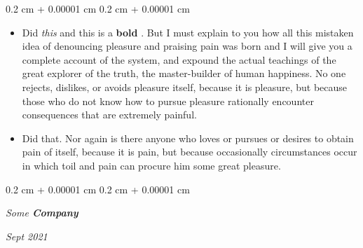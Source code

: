\documentclass[10pt, letterpaper]{article}
\newenvironment{highlights}{
    \begin{itemize}[
        topsep=0.10 cm,
        parsep=0.10 cm,
        partopsep=0pt,
        itemsep=0pt,
        leftmargin=0.4 cm + 10pt
    ]
}{
    \end{itemize}
} %
\newenvironment{onecolentry}{
    \begin{adjustwidth}{
        0.2 cm + 0.00001 cm
    }{
        0.2 cm + 0.00001 cm
    }
}{
    \end{adjustwidth}
} %
\newenvironment{twocolentry}[2][]{
    \onecolentry
    \def\secondColumn{#2}
    \setcolumnwidth{\fill, 4.5 cm}
    \begin{paracol}{2}
}{
    \switchcolumn \raggedleft \secondColumn
    \end{paracol}
    \endonecolentry
} %
\let\hrefWithoutArrow\href
\renewcommand{\href}[2]{\hrefWithoutArrow{#1}{\ifthenelse{\equal{#2}{}}{ }{#2 }\raisebox{.15ex}{\footnotesize \faExternalLink*}}}
\begin{document}
        \vspace{0.10 cm}
        \begin{onecolentry}
            \begin{highlights}
                \item Did \textit{this} and this is a \textbf{bold} \href{https://example.com}{link}. But I must explain to you how all this mistaken idea of denouncing pleasure and praising pain was born and I will give you a complete account of the system, and expound the actual teachings of the great explorer of the truth, the master-builder of human happiness. No one rejects, dislikes, or avoids pleasure itself, because it is pleasure, but because those who do not know how to pursue pleasure rationally encounter consequences that are extremely painful.
                \item Did that. Nor again is there anyone who loves or pursues or desires to obtain pain of itself, because it is pain, but because occasionally circumstances occur in which toil and pain can procure him some great pleasure.
            \end{highlights}
        \end{onecolentry}


        \vspace{0.2 cm}

            \begin{twocolentry}{


        \textit{Sept 2021}    }
                \textbf{}

                \textit{Some \textbf{Company}}
            \end{twocolentry}
\end{document}
